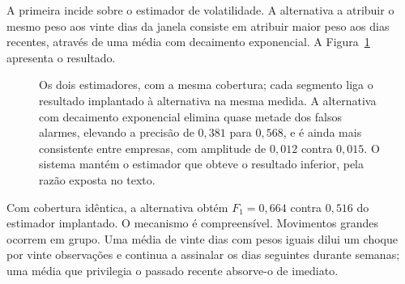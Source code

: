 A primeira incide sobre o estimador de volatilidade. A alternativa a atribuir o mesmo peso aos vinte
dias da janela consiste em atribuir maior peso aos dias recentes, através de uma média com
decaimento exponencial. A Figura~\ref{fig:av_ewma} apresenta o resultado.

\begin{figure}[htbp]
\centering
{}
\caption[Dois estimadores de volatilidade sobre o mesmo protocolo]{Os dois estimadores, com a mesma
cobertura; cada segmento liga o resultado implantado à alternativa na mesma medida. A alternativa
com decaimento exponencial elimina quase metade dos falsos alarmes,
elevando a precisão de $0{,}381$ para $0{,}568$, e é ainda mais consistente entre empresas, com
amplitude de $0{,}012$ contra $0{,}015$. O sistema mantém o estimador que obteve o resultado
inferior, pela razão exposta no texto.}
\label{fig:av_ewma}
\end{figure}

Com cobertura idêntica, a alternativa obtém $F_1 = 0{,}664$ contra $0{,}516$ do estimador
implantado. O mecanismo é compreensível. Movimentos grandes ocorrem em grupo. Uma média de vinte dias com
pesos iguais dilui um choque por vinte observações e continua a assinalar os dias seguintes
durante semanas; uma média que privilegia o passado recente absorve-o de imediato.

